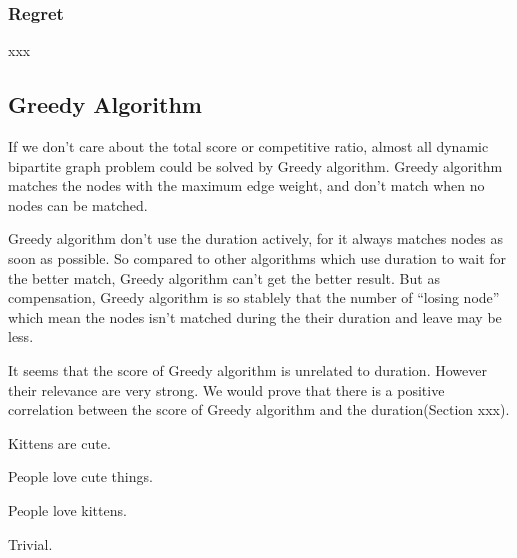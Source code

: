 \subsubsection{Regret}
xxx

\subsection{Greedy Algorithm}
\par If we don't care about the total score or competitive ratio, almost all dynamic bipartite graph problem could be solved by Greedy algorithm. Greedy algorithm matches the nodes with the maximum edge weight, and don't match when no nodes can be matched. 
\par  Greedy algorithm don't use the duration actively, for it always matches nodes as soon as possible. So compared to other algorithms which use duration to wait for the better match,  Greedy algorithm can't get the better result. But as compensation, Greedy algorithm is so stablely that the  number of  ``losing node'' which mean the nodes isn't matched during the their duration and leave may be less.
\par It seems that the score of Greedy algorithm is unrelated to duration. However their relevance are very strong. We would prove that there is a positive correlation between the score of Greedy algorithm and the duration(Section xxx).


\begin{property}
Kittens are cute.
\end{property}

\begin{lemma}
People love cute things.
\end{lemma}

\begin{theorem}\label{theorem:TheFatTreeInApx}
People love kittens.
\end{theorem}

\begin{IEEEproof}
Trivial.
\end{IEEEproof}


\begin{subequations}\label{opt:mcup}

\end{subequations}
